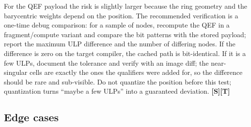\documentclass[11pt,a4paper]{article}
\newcommand{\evS}{\textsf{\textbf{\color{evS}[S]}}}
\newcommand{\evT}{\textsf{\textbf{\color{evT}[T]}}}
\newcommand{\code}[1]{\texttt{\detokenize{#1}}}
\theoremstyle{plain}
\theoremstyle{definition}
\theoremstyle{remark}
\begin{document}
For the QEF payload the risk is slightly larger because the ring geometry and
the barycentric weights depend on the position. The recommended verification
is a one-time debug comparison: for a sample of nodes, recompute the QEF in a
fragment/compute variant and compare the bit patterns with the stored payload;
report the maximum ULP difference and the number of differing nodes. If the
difference is zero on the target compiler, the cached path is bit-identical.
If it is a few ULPs, document the tolerance and verify with an image diff; the
near-singular cells are exactly the ones the \code{precise} qualifiers were
added for, so the difference should be rare and sub-visible. Do not quantize
the position before this test; quantization turns ``maybe a few ULPs'' into a
guaranteed deviation. \evS\evT

\subsection{Edge cases}
\end{document}
